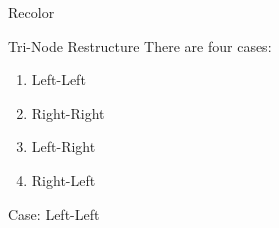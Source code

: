 \documentclass[aspectratio=169]{beamer}
\begin{document}
\begin{frame}[fragile]{Recolor}
\end{frame}

\begin{frame}{Tri-Node Restructure}
    There are four cases:
    \begin{enumerate}[label=\textit{(\roman*)}]
        \item Left-Left
        \item Right-Right
        \item Left-Right
        \item Right-Left
    \end{enumerate}
\end{frame}

\begin{frame}[fragile]{Case: Left-Left}
    \begin{center}
        \begin{minipage}{.4\textwidth}
            \begin{center}
\end{center}
\end{minipage}
\end{center}
\end{frame}
\end{document}
